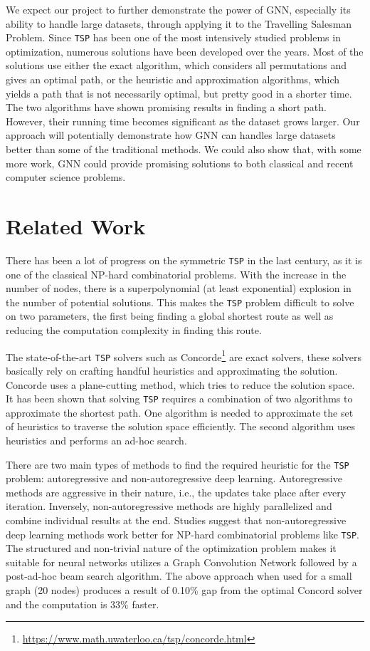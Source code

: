 \documentclass{article}
\begin{document}
We expect our project to further demonstrate the power of GNN, especially its ability to handle large datasets, through applying it to the Travelling Salesman Problem. Since
\texttt{TSP} has been one of the most intensively studied problems in optimization, numerous solutions have been developed over the years. Most of the solutions use either the
exact algorithm, which considers all permutations and gives an optimal path, or the heuristic and approximation algorithms, which yields a path that is not necessarily optimal,
but pretty good in a shorter time. The two algorithms have shown promising results in finding a short path. However, their running time becomes significant as the dataset grows
larger. Our approach will potentially demonstrate how GNN can handles large datasets better than some of the traditional methods. We could also show that, with some more work,
GNN could provide promising solutions to both classical and recent computer science problems.

\section{Related Work}\label{related}
There has been a lot of progress on the symmetric \texttt{TSP} in the last century, as it is one of the classical NP-hard combinatorial problems. With the increase in the number
of nodes, there is a superpolynomial (at least exponential) explosion in the number of  potential solutions. This makes the \texttt{TSP} problem difficult to solve on two parameters,
the first being finding a global shortest route as well as reducing the computation complexity in finding this route.

The state-of-the-art \texttt{TSP} solvers such as Concorde\footnote{\url{https://www.math.uwaterloo.ca/tsp/concorde.html}} are exact solvers, these solvers basically rely on
crafting handful heuristics and approximating the solution. Concorde uses a plane-cutting method, which tries to reduce the solution space. It has been shown that solving
\texttt{TSP} requires a combination of two algorithms to approximate the shortest path. One algorithm is needed to approximate the set of heuristics to traverse the solution
space efficiently. The second algorithm uses heuristics and performs an ad-hoc search\cite{abs-1906-01227}.

There are two main types of methods to find the required heuristic for the \texttt{TSP} problem: autoregressive and non-autoregressive deep learning. Autoregressive methods
are aggressive in their nature, i.e., the updates take place after every iteration. Inversely, non-autoregressive methods are highly parallelized and combine individual results
at the end.  Studies suggest that non-autoregressive deep learning methods work better for \(\mathrm{NP}\)-hard combinatorial problems like \texttt{TSP}\cite{abs-1906-01227}. The
structured and non-trivial nature of the optimization problem makes it suitable for neural networks\cite{abs-1906-01227} utilizes a Graph Convolution Network followed by a post-ad-hoc
beam search algorithm. The above approach when used for a small graph (20 nodes) produces a result of 0.10\% gap from the optimal Concord solver and the computation is \(33\%\) faster.
\end{document}
